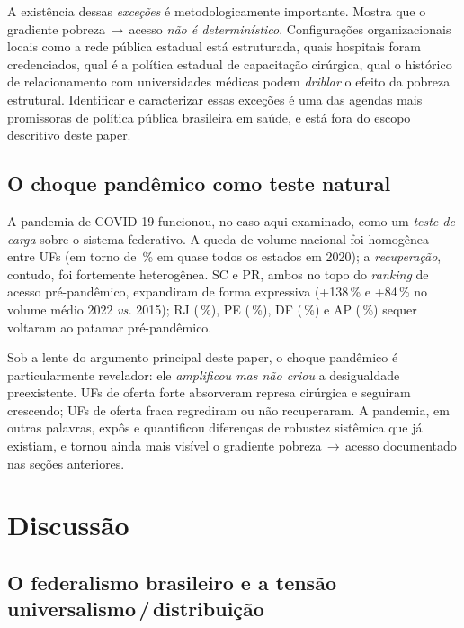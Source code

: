 \documentclass[12pt,a4paper,oneside]{article}
\begin{document}
A existência dessas \textit{exceções} é metodologicamente
importante. Mostra que o gradiente pobreza\,$\rightarrow$\,acesso
\textit{não é determinístico}. Configurações organizacionais
locais \textemdash{} como a rede pública estadual está
estruturada, quais hospitais foram credenciados, qual é a
política estadual de capacitação cirúrgica, qual o histórico de
relacionamento com universidades médicas \textemdash{} podem
\textit{driblar} o efeito da pobreza estrutural. Identificar e
caracterizar essas exceções é uma das agendas mais promissoras
de política pública brasileira em saúde, e está fora do escopo
descritivo deste paper.

\subsection{O choque pandêmico como teste natural}\label{sub:covid}

A pandemia de COVID-19 funcionou, no caso aqui examinado, como
um \textit{teste de carga} sobre o sistema federativo. A queda
de volume nacional foi homogênea entre UFs (em torno de
\,\% em quase todos os estados em
2020); a \textit{recuperação}, contudo, foi
fortemente heterogênea. SC e PR, ambos no topo do
\textit{ranking} de acesso pré-pandêmico, expandiram de forma
expressiva (+138\,\% e +84\,\% no volume médio
2022 \textit{vs.} 2015); RJ
(\,\%), PE (\,\%), DF (\,\%)
e AP (\,\%) sequer voltaram ao patamar
pré-pandêmico.

Sob a lente do argumento principal deste paper, o choque
pandêmico é particularmente revelador: ele \textit{amplificou
mas não criou} a desigualdade preexistente. UFs de oferta forte
absorveram represa cirúrgica e seguiram crescendo; UFs de oferta
fraca regrediram ou não recuperaram. A pandemia, em outras
palavras, expôs e quantificou diferenças de robustez sistêmica
que já existiam, e tornou ainda mais visível o gradiente
pobreza\,$\rightarrow$\,acesso documentado nas seções anteriores.

\section{Discussão}\label{sec:discussao}

\subsection{O federalismo brasileiro e a tensão
universalismo\,/\,distribuição}
\end{document}
